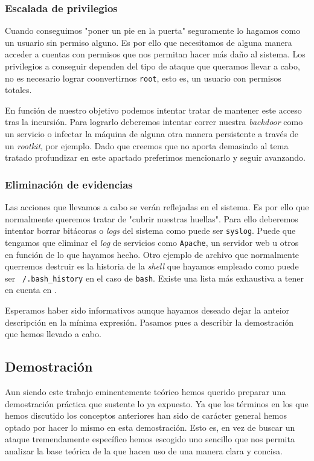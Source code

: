 \documentclass[12pt]{article}
\newcommand{\newpar} {
    \vskip 0.5cm
}
\begin{document}
            \subsubsection{Escalada de privilegios}
                Cuando conseguimos "poner un pie en la puerta" seguramente lo hagamos como un usuario sin permiso alguno. Es por ello que necesitamos de alguna manera acceder a cuentas con permisos que nos permitan hacer más daño al sistema. Los privilegios a conseguir dependen del tipo de ataque que queramos llevar a cabo, no es necesario lograr coonvertirnos \texttt{root}, esto es, un usuario con permisos totales.

                \newpar

                En función de nuestro objetivo podemos intentar tratar de mantener este acceso tras la incursión. Para lograrlo deberemos intentar correr nuestra \textit{backdoor} como un servicio o infectar la máquina de alguna otra manera persistente a través de un \textit{rootkit}, por ejemplo. Dado que creemos que no aporta demasiado al tema tratado profundizar en este apartado preferimos mencionarlo y seguir avanzando.

            \subsubsection{Eliminación de evidencias}
                Las acciones que llevamos a cabo se verán reflejadas en el sistema. Es por ello que normalmente queremos tratar de "cubrir nuestras huellas". Para ello deberemos intentar borrar bitácoras o \textit{logs} del sistema como puede ser \texttt{syslog}. Puede que tengamos que eliminar el \textit{log} de servicios como \texttt{Apache}, un servidor web u otros en función de lo que hayamos hecho. Otro ejemplo de archivo que normalmente querremos destruir es la historia de la \textit{shell} que hayamos empleado como puede ser \texttt{~/.bash\_history} en el caso de \texttt{bash}. Existe una lista más exhaustiva a tener en cuenta en \cite{bib:log_files}.

            \newpar

            Esperamos haber sido informativos aunque hayamos deseado dejar la anteior descripción en la mínima expresión. Pasamos pues a describir la demostración que hemos llevado a cabo.

        \subsection{Demostración}
            Aun siendo este trabajo eminentemente teórico hemos querido preparar una demostración práctica que sustente lo ya expuesto. Ya que los términos en los que hemos discutido los conceptos anteriores han sido de carácter general hemos optado por hacer lo mismo en esta demostración. Esto es, en vez de buscar un ataque tremendamente específico hemos escogido uno sencillo que nos permita analizar la base teórica de la que hacen uso de una manera clara y concisa.
\end{document}
